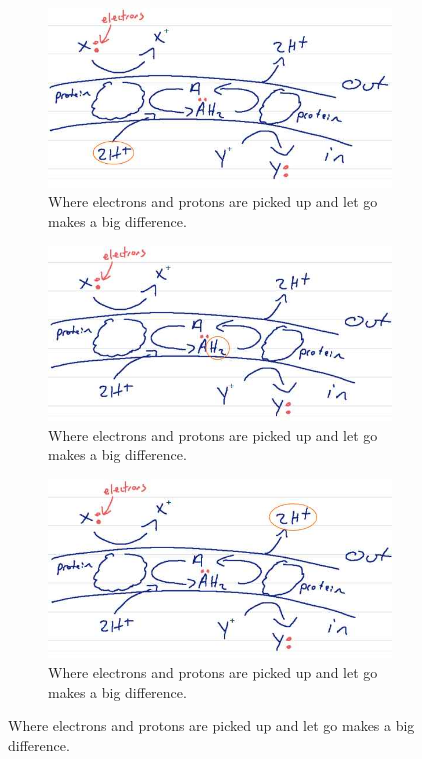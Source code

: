 \documentclass[]{article}
\begin{document}
\begin{figure}[H]
\begin{subfigure}[t]{0.45\textwidth}
	\end{subfigure}
	\begin{subfigure}[t]{0.3\textwidth}
		\caption{Where electrons and protons are picked up and let go makes a big difference.}\label{fig:RedoxLoop2}
		\includegraphics[width=\textwidth]{RedoxLoop2}
	\end{subfigure}
	\begin{subfigure}[t]{0.3\textwidth}
		\caption{Where electrons and protons are picked up and let go makes a big difference.}\label{fig:RedoxLoop3}
		\includegraphics[width=\textwidth]{RedoxLoop3}
	\end{subfigure}
	\begin{subfigure}[t]{0.3\textwidth}
		\caption{Where electrons and protons are picked up and let go makes a big difference.}\label{fig:RedoxLoop4}
		\includegraphics[width=\textwidth]{RedoxLoop4}
	\end{subfigure}
\end{figure}
\end{document}
